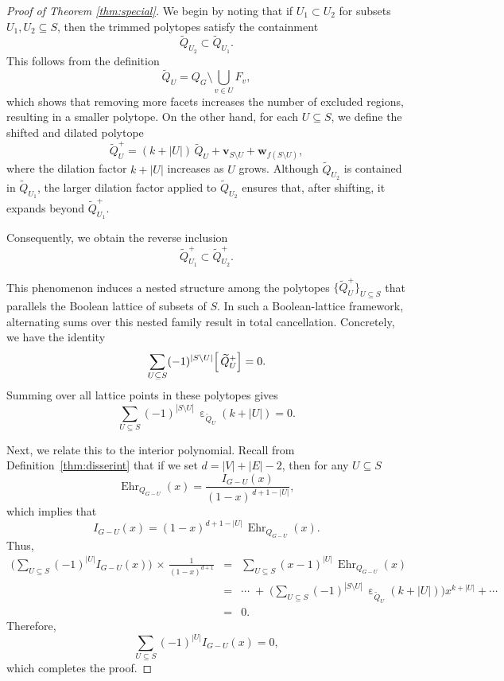 \documentclass{amsart}
\theoremstyle{definition}
\theoremstyle{remark}
\DeclareMathOperator{\Ehr}{Ehr}
\DeclareMathOperator{\ehr}{\varepsilon}
\numberwithin{equation}{section}
\begin{document}
\begin{proof}[Proof of Theorem \ref{thm:special}]
We begin by noting that if $U_1 \subset U_2$ for subsets $U_1, U_2 \subseteq S$, then the trimmed polytopes satisfy the containment  
\[
\widetilde{Q}_{U_2} \subset \widetilde{Q}_{U_1}.
\]
This follows from the definition  
\[
\widetilde{Q}_U = Q_G \setminus \bigcup_{v \in U} F_v,
\]
which shows that removing more facets increases the number of excluded regions, resulting in a smaller polytope. On the other hand, for each $U \subseteq S$, we define the shifted and dilated polytope
\[
\widetilde{Q}_U^+ = (k+|U|)\,\widetilde{Q}_U + \mathbf{v}_{S\setminus U} + \mathbf{w}_{f(S\setminus U)},
\]
where the dilation factor $k+|U|$ increases as $U$ grows. Although $\widetilde{Q}_{U_2}$ is contained in $\widetilde{Q}_{U_1}$, the larger dilation factor applied to $\widetilde{Q}_{U_2}$ ensures that, after shifting, it expands beyond $\widetilde{Q}_{U_1}^+$. 

Consequently, we obtain the reverse inclusion
\[
\widetilde{Q}_{U_1}^+ \subset \widetilde{Q}_{U_2}^+.
\]

This phenomenon induces a nested structure among the polytopes $\{\widetilde{Q}_U^+\}_{U\subseteq S}$ that parallels the Boolean lattice of subsets of $S$. In such a Boolean-lattice framework, alternating sums over this nested family result in total cancellation. Concretely, we have the identity
\[
\sum_{U \subseteq S}
(-1)^{|S\setminus U|}
\Bigl[\,\widetilde{Q}_U^{+}\Bigr]
= 0.
\]
Summing over all lattice points in these polytopes gives
\[
\sum_{U\subseteq S}(-1)^{|S\setminus U|}\,\ehr_{\widetilde{Q}_U}(k+|U|)
= 0.
\]

Next, we relate this to the interior polynomial. Recall from Definition~\ref{thm:disserint} that if we set $d=|V|+|E|-2$, then for any $U\subseteq S$
\[
\Ehr_{Q_{G-U}}(x)
= \frac{I_{G-U}(x)}{(1-x)^{\,d+1-|U|}},
\]
which implies that
\[
I_{G-U}(x)
= (1-x)^{d+1-|U|}\,\Ehr_{Q_{G-U}}(x).
\]
Thus,
\begin{eqnarray*}
\Biggl(\sum_{U\subseteq S}(-1)^{|U|}I_{G-U}(x)\Biggr)\,\times\,\frac{1}{(1-x)^{d+1}}
&=& \sum_{U\subseteq S}(x-1)^{|U|}\,\Ehr_{Q_{G-U}}(x)\\[1mm]
&=& \cdots\;+\;\Biggl(\sum_{U\subseteq S}(-1)^{|S\setminus U|}\,\ehr_{\widetilde{Q}_U}(k+|U|)\Biggr)x^{k+|U|}+\cdots\\[1mm]
&=& 0.
\end{eqnarray*}
Therefore,
\[
\sum_{U\subseteq S}(-1)^{|U|} I_{G-U}(x)
= 0,
\]
which completes the proof.

\end{proof}
\end{document}
